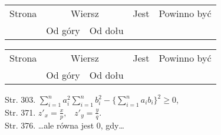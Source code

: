 \documentclass[a4paper,11pt]{article}
\begin{document}
\begin{center}

  \begin{tabular}{|c|c|c|c|c|}
    \hline
    Strona & \multicolumn{2}{c|}{Wiersz} & Jest
                              & Powinno być \\ \cline{2-3}
    & Od góry & Od dołu & & \\
    \hline
    \hline
  \end{tabular}





  \newpage

  \begin{tabular}{|c|c|c|c|c|}
    \hline
    Strona & \multicolumn{2}{c|}{Wiersz} & Jest
                              & Powinno być \\ \cline{2-3}
    & Od góry & Od dołu & & \\
    \hline
    \hline
  \end{tabular}

\end{center}

\vspace{\spaceTwo}


\noindent
Str. 303.
$\displaystyle \sum_{ i = 1 }^{ n } a_{ i }^{2} \sum_{ i = 1 }^{ n } b_{ i }^{
  2 }
- \{ \sum_{ i = 1 }^{ n } a_{ i } b_{ i } \}^{ 2 } \geq 0$, \\
Str. 371. $\displaystyle z'_{ x } = \frac{ x }{ p }\textrm{,} \quad
z'_{ y } = \frac{ y }{ q }\textrm{.}$ \\
Str. 376. \ldots ale równa jest 0, gdy\ldots


\end{document}
